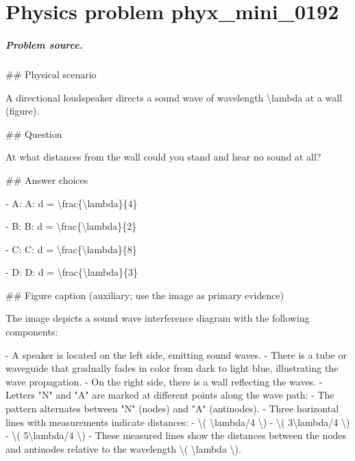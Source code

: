 
\chapter{Physics problem phyx\_mini\_0192}
\label{ch:PhyXMiniProblems_problem_phyx_mini_0192}

\paragraph{Problem source.}
\#\# Physical scenario

A directional loudspeaker directs a sound wave of wavelength \textbackslash{}lambda at a wall (figure).

\#\# Question

At what distances from the wall could you stand and hear no sound at all?

\#\# Answer choices

- A: A: d = \textbackslash{}frac\{\textbackslash{}lambda\}\{4\}

- B: B: d = \textbackslash{}frac\{\textbackslash{}lambda\}\{2\}

- C: C: d = \textbackslash{}frac\{\textbackslash{}lambda\}\{8\}

- D: D: d = \textbackslash{}frac\{\textbackslash{}lambda\}\{3\}

\#\# Figure caption (auxiliary; use the image as primary evidence)

The image depicts a sound wave interference diagram with the following components:

- A speaker is located on the left side, emitting sound waves.
- There is a tube or waveguide that gradually fades in color from dark to light blue, illustrating the wave propagation.
- On the right side, there is a wall reflecting the waves.
- Letters "N" and "A" are marked at different points along the wave path:
  - The pattern alternates between "N" (nodes) and "A" (antinodes).
- Three horizontal lines with measurements indicate distances:
  - \textbackslash{}( \textbackslash{}lambda/4 \textbackslash{})
  - \textbackslash{}( 3\textbackslash{}lambda/4 \textbackslash{})
  - \textbackslash{}( 5\textbackslash{}lambda/4 \textbackslash{})
- These measured lines show the distances between the nodes and antinodes relative to the wavelength \textbackslash{}( \textbackslash{}lambda \textbackslash{}).

